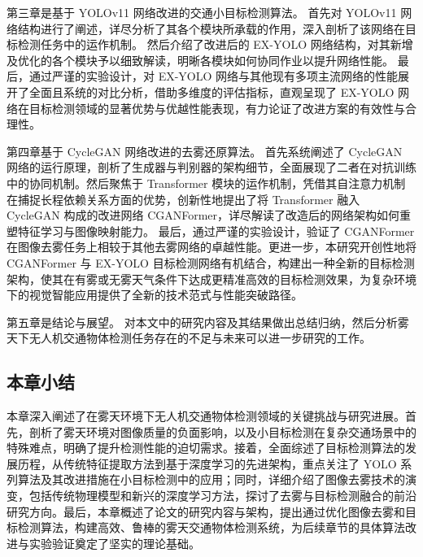 第三章是基于 YOLOv11 网络改进的交通小目标检测算法。
首先对 YOLOv11 网络结构进行了阐述，详尽分析了其各个模块所承载的作用，深入剖析了该网络在目标检测任务中的运作机制。
然后介绍了改进后的 EX-YOLO 网络结构，对其新增及优化的各个模块予以细致解读，明晰各模块如何协同作业以提升网络性能。
最后，通过严谨的实验设计，对 EX-YOLO 网络与其他现有多项主流网络的性能展开了全面且系统的对比分析，借助多维度的评估指标，直观呈现了 EX-YOLO 网络在目标检测领域的显著优势与优越性能表现，有力论证了改进方案的有效性与合理性。

第四章基于 CycleGAN 网络改进的去雾还原算法。
首先系统阐述了 CycleGAN 网络的运行原理，剖析了生成器与判别器的架构细节，全面展现了二者在对抗训练中的协同机制。然后聚焦于 Transformer 模块的运作机制，凭借其自注意力机制在捕捉长程依赖关系方面的优势，创新性地提出了将 Transformer 融入 CycleGAN 构成的改进网络 CGANFormer，详尽解读了改造后的网络架构如何重塑特征学习与图像映射能力。
最后，通过严谨的实验设计，验证了 CGANFormer 在图像去雾任务上相较于其他去雾网络的卓越性能。更进一步，本研究开创性地将 CGANFormer 与 EX-YOLO 目标检测网络有机结合，构建出一种全新的目标检测架构，使其在有雾或无雾天气条件下达成更精准高效的目标检测效果，为复杂环境下的视觉智能应用提供了全新的技术范式与性能突破路径。

第五章是结论与展望。
对本文中的研究内容及其结果做出总结归纳，然后分析雾天下无人机交通物体检测任务存在的不足与未来可以进一步研究的工作。

\subsection{本章小结}

本章深入阐述了在雾天环境下无人机交通物体检测领域的关键挑战与研究进展。首先，剖析了雾天环境对图像质量的负面影响，以及小目标检测在复杂交通场景中的特殊难点，明确了提升检测性能的迫切需求。接着，全面综述了目标检测算法的发展历程，从传统特征提取方法到基于深度学习的先进架构，重点关注了 YOLO 系列算法及其改进措施在小目标检测中的应用；同时，详细介绍了图像去雾技术的演变，包括传统物理模型和新兴的深度学习方法，探讨了去雾与目标检测融合的前沿研究方向。最后，本章概述了论文的研究内容与架构，提出通过优化图像去雾和目标检测算法，构建高效、鲁棒的雾天交通物体检测系统，为后续章节的具体算法改进与实验验证奠定了坚实的理论基础。
